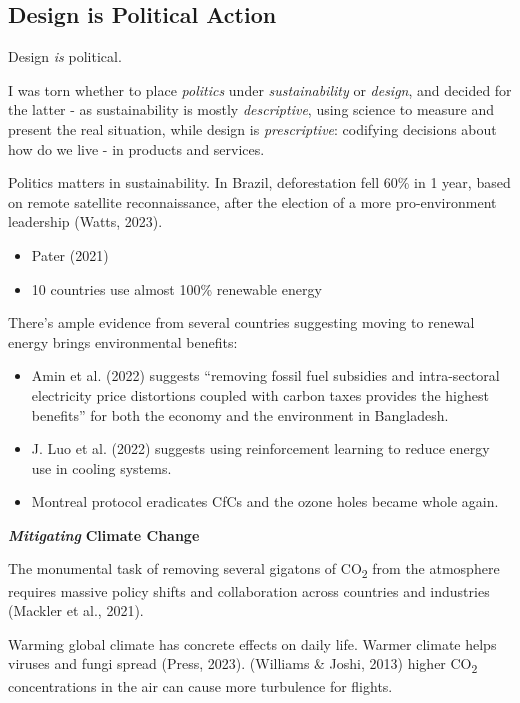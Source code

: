 \documentclass[
  letterpaper,
  DIV=11,
  numbers=noendperiod]{scrartcl}
\providecommand{\tightlist}{%
  \setlength{\itemsep}{0pt}\setlength{\parskip}{0pt}}\usepackage{longtable,booktabs,array}
\begin{document}
\subsection{Design is Political
Action}\label{design-is-political-action}

Design \emph{is} political.

I was torn whether to place \emph{politics} under \emph{sustainability}
or \emph{design}, and decided for the latter - as sustainability is
mostly \emph{descriptive}, using science to measure and present the real
situation, while design is \emph{prescriptive}: codifying decisions
about how do we live - in products and services.

Politics matters in sustainability. In Brazil, deforestation fell 60\%
in 1 year, based on remote satellite reconnaissance, after the election
of a more pro-environment leadership (Watts, 2023).

\begin{itemize}
\tightlist
\item
  Pater (2021)
\item
  10 countries use almost 100\% renewable energy
\end{itemize}

There's ample evidence from several countries suggesting moving to
renewal energy brings environmental benefits:

\begin{itemize}
\item
  Amin et al. (2022) suggests ``removing fossil fuel subsidies and
  intra-sectoral electricity price distortions coupled with carbon taxes
  provides the highest benefits'' for both the economy and the
  environment in Bangladesh.
\item
  J. Luo et al. (2022) suggests using reinforcement learning to reduce
  energy use in cooling systems.
\item
  Montreal protocol eradicates CfCs and the ozone holes became whole
  again.
\end{itemize}

\textbf{\emph{Mitigating}} \textbf{Climate Change}

The monumental task of removing several gigatons of CO\textsubscript{2}
from the atmosphere requires massive policy shifts and collaboration
across countries and industries (Mackler et al., 2021).

Warming global climate has concrete effects on daily life. Warmer
climate helps viruses and fungi spread (Press, 2023). (Williams \&
Joshi, 2013) higher CO\textsubscript{2} concentrations in the air can
cause more turbulence for flights.
\end{document}
